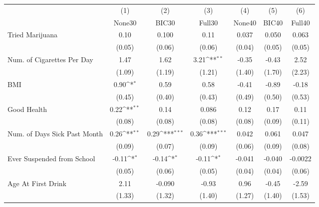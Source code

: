 {
\def\sym#1{\ifmmode^{#1}\else\(^{#1}\)\fi}
\begin{tabular}{l*{6}{c}}
\toprule
            &\multicolumn{1}{c}{(1)}&\multicolumn{1}{c}{(2)}&\multicolumn{1}{c}{(3)}&\multicolumn{1}{c}{(4)}&\multicolumn{1}{c}{(5)}&\multicolumn{1}{c}{(6)}\\
            &\multicolumn{1}{c}{None30}&\multicolumn{1}{c}{BIC30}&\multicolumn{1}{c}{Full30}&\multicolumn{1}{c}{None40}&\multicolumn{1}{c}{BIC40}&\multicolumn{1}{c}{Full40}\\
\midrule
Tried Marijuana&        0.10         &       0.100         &        0.11         &       0.037         &       0.050         &       0.063         \\
            &      (0.05)         &      (0.06)         &      (0.06)         &      (0.04)         &      (0.05)         &      (0.05)         \\
\addlinespace
Num. of Cigarettes Per Day&        1.47         &        1.62         &        3.21\sym{**} &       -0.35         &       -0.43         &        2.52         \\
            &      (1.09)         &      (1.19)         &      (1.21)         &      (1.40)         &      (1.70)         &      (2.23)         \\
\addlinespace
BMI         &        0.90\sym{*}  &        0.59         &        0.58         &       -0.41         &       -0.89         &       -0.18         \\
            &      (0.45)         &      (0.40)         &      (0.43)         &      (0.49)         &      (0.50)         &      (0.53)         \\
\addlinespace
Good Health &        0.22\sym{**} &        0.14         &       0.086         &        0.12         &        0.17         &        0.11         \\
            &      (0.08)         &      (0.08)         &      (0.08)         &      (0.08)         &      (0.09)         &      (0.11)         \\
\addlinespace
Num. of Days Sick Past Month&        0.26\sym{**} &        0.29\sym{***}&        0.36\sym{***}&       0.042         &       0.061         &       0.047         \\
            &      (0.09)         &      (0.07)         &      (0.09)         &      (0.06)         &      (0.09)         &      (0.08)         \\
\addlinespace
Ever Suspended from School&       -0.11\sym{*}  &       -0.14\sym{*}  &       -0.11\sym{*}  &      -0.041         &      -0.040         &     -0.0022         \\
            &      (0.05)         &      (0.06)         &      (0.05)         &      (0.04)         &      (0.04)         &      (0.06)         \\
\addlinespace
Age At First Drink&        2.11         &      -0.090         &       -0.93         &        0.96         &       -0.45         &       -2.59         \\
            &      (1.33)         &      (1.32)         &      (1.40)         &      (1.27)         &      (1.40)         &      (1.53)         \\
\bottomrule
\end{tabular}
}
